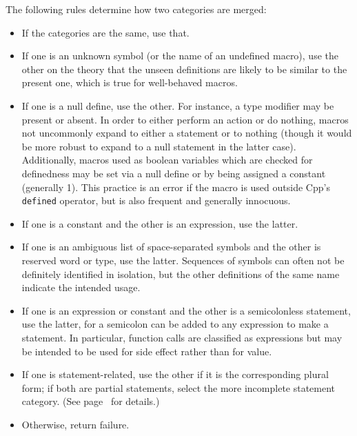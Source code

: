 \documentclass[10pt]{article}
\begin{document}
The following rules determine how two categories are merged:
\begin{itemize}\itemsep 0pt \parskip 0pt

\item If the categories are the same, use that.

\item If one is an unknown symbol (or the name of an undefined macro), use
  the other on the theory that the unseen definitions are likely to be
  similar to the present one, which is true for well-behaved macros.

\item If one is a null define, use the other.  For instance, a type
  modifier may be present or absent.  In order to either perform an action
  or do nothing, macros not uncommonly expand to either a statement or to
  nothing (though it would be more robust to expand to a null statement in
  the latter case).  Additionally, macros used as boolean variables which
  are checked for definedness may be set via a null define or by being
  assigned a constant (generally 1).  This practice is an error if the
  macro is used outside Cpp's {\tt defined} operator, but is also frequent
  and generally innocuous.

\item If one is a constant and the other is an expression, use the latter.

\item If one is an ambiguous list of space-separated symbols and the other
  is reserved word or type, use the latter.  Sequences of symbols can often
  not be definitely identified in isolation, but the other definitions of
  the same name indicate the intended usage.

\item If one is an expression or constant and the other is a semicolonless
  statement, use the latter, for a semicolon can be added to any expression
  to make a statement.  In particular, function calls are classified as
  expressions but may be intended to be used for side effect rather than
  for value.

\item If one is statement-related, use the other if it is the corresponding
  plural form; if both are partial statements, select the more incomplete
  statement category.  (See page~\pageref{item:statement-category} for
  details.)

\item Otherwise, return failure.
\end{itemize}
\end{document}
